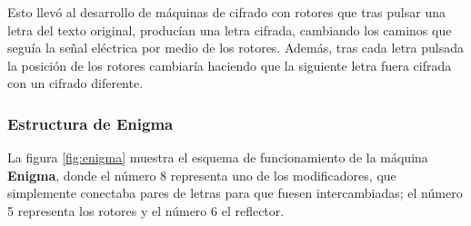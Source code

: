 \documentclass[nochap]{apuntesURJC}
\begin{document}
Esto llevó al desarrollo de máquinas de cifrado con rotores que tras pulsar una letra del texto original, producían una letra cifrada, cambiando los caminos que seguía la señal eléctrica por medio de los rotores. Además, tras cada letra pulsada la posición de los rotores cambiaría haciendo que la siguiente letra fuera cifrada con un cifrado diferente.

\subsubsection{Estructura de Enigma}

La figura \ref{fig:enigma} muestra el esquema de funcionamiento de la máquina \textbf{Enigma}, donde el número 8 representa uno de los modificadores, que simplemente conectaba pares de letras para que fuesen intercambiadas; el número 5 representa los rotores y el número 6 el reflector.

\vspace{1cm}
\end{document}
